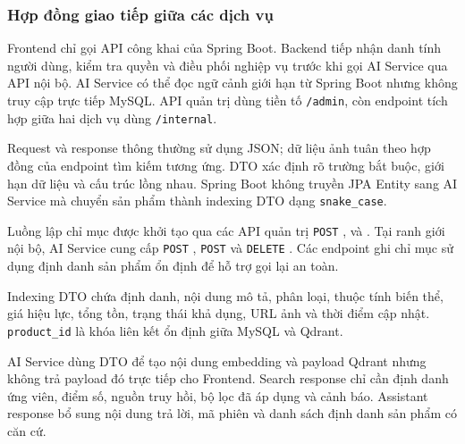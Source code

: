 \subsubsection{Hợp đồng giao tiếp giữa các dịch vụ}

Frontend chỉ gọi API công khai của Spring Boot. Backend tiếp nhận danh tính người dùng, kiểm tra quyền và điều phối nghiệp vụ trước khi gọi AI Service qua API nội bộ. AI Service có thể đọc ngữ cảnh giới hạn từ Spring Boot nhưng không truy cập trực tiếp MySQL. API quản trị dùng tiền tố \texttt{/admin}, còn endpoint tích hợp giữa hai dịch vụ dùng \texttt{/internal}.

Request và response thông thường sử dụng JSON; dữ liệu ảnh tuân theo hợp đồng của endpoint tìm kiếm tương ứng. DTO xác định rõ trường bắt buộc, giới hạn dữ liệu và cấu trúc lồng nhau. Spring Boot không truyền JPA Entity sang AI Service mà chuyển sản phẩm thành indexing DTO dạng \texttt{snake\_case}.

Luồng lập chỉ mục được khởi tạo qua các API quản trị \texttt{POST} ,  và . Tại ranh giới nội bộ, AI Service cung cấp \texttt{POST} , \texttt{POST}  và \texttt{DELETE} . Các endpoint ghi chỉ mục sử dụng định danh sản phẩm ổn định để hỗ trợ gọi lại an toàn.

Indexing DTO chứa định danh, nội dung mô tả, phân loại, thuộc tính biến thể, giá hiệu lực, tổng tồn, trạng thái khả dụng, URL ảnh và thời điểm cập nhật. \texttt{product\_id} là khóa liên kết ổn định giữa MySQL và Qdrant.

AI Service dùng DTO để tạo nội dung embedding và payload Qdrant nhưng không trả payload đó trực tiếp cho Frontend. Search response chỉ cần định danh ứng viên, điểm số, nguồn truy hồi, bộ lọc đã áp dụng và cảnh báo. Assistant response bổ sung nội dung trả lời, mã phiên và danh sách định danh sản phẩm có căn cứ.

